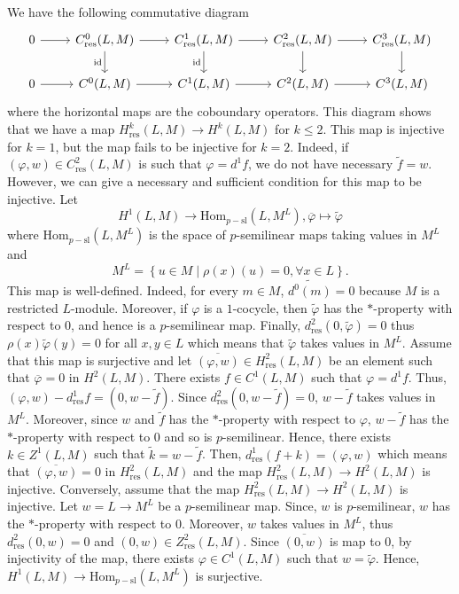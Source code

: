 \documentclass[11pt, twoside]{article}
\begin{document}
We have the following commutative diagram \[\begin{tikzcd}
	0 & {C_\mathrm{res}^0(L,M)} & {C_\mathrm{res}^1(L,M)} & {C_\mathrm{res}^2(L,M)} & {C_\mathrm{res}^3(L,M)} \\
	0 & {C^0(L,M)} & {C^1(L,M)} & {C^2(L,M)} & {C^3(L,M)}
	\arrow[from=1-1, to=1-2]
	\arrow[from=1-2, to=1-3]
	\arrow["{\mathrm{id}}"', from=1-2, to=2-2]
	\arrow[from=1-3, to=1-4]
	\arrow["{\mathrm{id}}"', from=1-3, to=2-3]
	\arrow[from=1-4, to=1-5]
	\arrow[from=1-4, to=2-4]
	\arrow[from=1-5, to=2-5]
	\arrow[from=2-1, to=2-2]
	\arrow[from=2-2, to=2-3]
	\arrow[from=2-3, to=2-4]
	\arrow[from=2-4, to=2-5]
\end{tikzcd}\] where the horizontal maps are the coboundary operators. This diagram shows that we have a map $H_\mathrm{res}^k(L,M)\to H^k(L,M) $ for $k\leq 2$. This map is injective for $k=1$, but the map fails to be injective for $k=2$. Indeed, if $(\varphi,w)\in C^2_\mathrm{res}(L,M) $ is such that $\varphi=d^1f $, we do not have necessary $\tilde{f}=w $. However, we can give a necessary and sufficient condition for this map to be injective. Let $$H^1(L,M)\to \mathrm{Hom}_{p-\mathrm{sl}}(L,M^L), \overline{\varphi}\mapsto \tilde{\varphi} $$ where $\mathrm{Hom}_{p-\mathrm{sl}}(L,M^L) $ is the space of $p$-semilinear maps taking values in $M^L$ and $$M^L=\left\{ u\in M\mid \rho(x)(u)=0, \forall x\in L\right\}.$$ This map is well-defined. Indeed, for every $m\in M$, $\widetilde{d^0(m)}=0$ because $M$ is a restricted $L$-module. Moreover, if $\varphi $ is a $1$-cocycle, then $\tilde{\varphi} $ has the $*$-property with respect to $0$, and hence is a $p$-semilinear map. Finally, $d^2_\mathrm{res}(0,\tilde{\varphi})=0 $ thus $\rho(x)\tilde{\varphi}(y)=0 $ for all $x,y\in L $ which means that $\tilde{\varphi} $ takes values in $M^L$. Assume that this map is surjective and let $\overline{(\varphi,w)}\in H^2_\mathrm{res}(L,M) $ be an element such that $\overline{\varphi}=0 $ in $H^2(L,M)$. There exists $f\in C^1(L,M)$ such that $\varphi=d^1f $. Thus, $(\varphi,w)-d^1_\mathrm{res}f=(0,w-\tilde{f}) $. Since $d^2_\mathrm{res}(0,w-\tilde{f})=0 $, $w-\tilde{f} $ takes values in $M^L$. Moreover, since $w$ and $\tilde{f}$ has the $*$-property with respect to $\varphi$, $w-\tilde{f}$ has the $*$-property with respect to $0$ and so is $p$-semilinear. Hence, there exists $k\in Z^1(L,M)$ such that $\tilde{k}=w-\tilde{f} $. Then, $d^1_\mathrm{res}(f+k)=(\varphi,w) $ which means that $\overline{(\varphi,w)}=0 $ in $H^2_\mathrm{res}(L,M)$ and the map $H^2_\mathrm{res}(L,M)\to H^2(L,M) $ is injective. Conversely, assume that the map $H^2_\mathrm{res}(L,M)\to H^2(L,M) $ is injective. Let $w=L\to M^L $ be a $p$-semilinear map. Since, $w $ is $p$-semilinear, $w$ has the $*$-property with respect to $0$. Moreover, $w $ takes values in $M^L$, thus $d^2_\mathrm{res}(0,w)=0 $ and $(0,w)\in Z^2_\mathrm{res}(L,M) $. Since $\overline{(0,w)} $ is map to $0$, by injectivity of the map, there exists $\varphi\in C^1(L,M)$ such that $w=\tilde{\varphi} $. Hence, $H^1(L,M)\to \mathrm{Hom}_{p-\mathrm{sl}}(L,M^L) $ is surjective.
\end{document}
